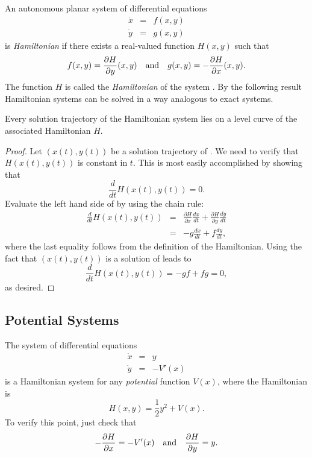 \documentclass{ximera}
\begin{document}
An autonomous planar system of differential equations 
\begin{equation}  \label{e:ham}
\begin{array}{rcl} 
\dot{x} & = & f(x,y) \\
\dot{y} & = & g(x,y) 
\end{array}
\end{equation}
is {\em Hamiltonian\/} if there exists a real-valued
function $H(x,y)$ such that 
\[
f(x,y) = \frac{\partial H}{\partial y}(x,y) \quad\mbox{and}\quad 
g(x,y) =-\frac{\partial H}{\partial x}(x,y).
\]
The function $H$ is called the {\em Hamiltonian\/}
of the system .
By the following result Hamiltonian systems can be solved in a way analogous 
to exact systems.

\begin{thm}
Every solution trajectory of the Hamiltonian system  lies
on a level curve of the associated Hamiltonian $H$.
\end{thm}

\begin{proof} 
Let $(x(t),y(t))$ be a solution trajectory of .  We need to 
verify that $H(x(t),y(t))$ is constant in $t$.  This is most easily 
accomplished by showing that 
\begin{equation} \label{e:dH=0}
\frac{d}{dt} H(x(t),y(t)) = 0.
\end{equation}
Evaluate the left hand side of  by using the chain rule:
\begin{eqnarray*}
\frac{d}{dt} H(x(t),y(t)) & = & \frac{\partial H}{\partial x}\frac{dx}{dt}
+ \frac{\partial H}{\partial y} \frac{dy}{dt} \\
& = & -g\frac{dx}{dt} + f\frac{dy}{dt}, 
\end{eqnarray*}
where the last equality follows from the definition of the Hamiltonian.  
Using the fact that $(x(t),y(t))$ is a solution of  leads to 
\[
 \frac{d}{dt} H(x(t),y(t)) = -gf+fg = 0,
\]
as desired.  \end{proof}

\subsection*{Potential Systems}
The system of differential equations
\begin{equation}  \label{e:hamex}
\begin{array}{rcl} 
\dot{x} & = & y \\
\dot{y} & = & -V'(x) 
\end{array}
\end{equation}
is a Hamiltonian system for any {\em potential\/} function $V(x)$,
where the Hamiltonian is
\[
H(x,y) = \frac{1}{2}y^2 + V(x).
\]
To verify this point, just check that 
\[
-\frac{\partial H}{\partial x} = -V'(x) \quad\mbox{and}\quad \frac{\partial H}{\partial y} = y.
\]
\end{document}
